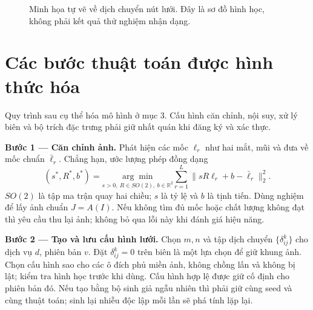 \documentclass[11pt,a4paper]{article}
\newcommand{\R}{\mathbb{R}}
\begin{document}
\begin{figure}[!ht]
\centering
{}
\caption{Minh họa tự vẽ về dịch chuyển nút lưới. Đây là sơ đồ hình học, không phải kết quả thử nghiệm nhận dạng.}
\end{figure}

\newpage
\section{Các bước thuật toán được hình thức hóa}
Quy trình sau cụ thể hóa mô hình ở mục 3. Cấu hình căn chỉnh, nội suy, xử lý biên và bộ trích đặc trưng phải giữ nhất quán khi đăng ký và xác thực.

\textbf{Bước 1 --- Căn chỉnh ảnh.} Phát hiện các mốc $\ell_r$ như hai mắt, mũi và đưa về mốc chuẩn $\bar\ell_r$. Chẳng hạn, ước lượng phép đồng dạng
\begin{equation}\label{eq:align}
 (s^*,R^*,b^*)=\underset{s>0,\ R\in SO(2),\ b\in\R^2}{\arg\min}
 \sum_{r=1}^{L}\|sR\ell_r+b-\bar\ell_r\|_2^2.
\end{equation}
$SO(2)$ là tập ma trận quay hai chiều; $s$ là tỷ lệ và $b$ là tịnh tiến. Dùng nghiệm để lấy ảnh chuẩn $J=A(I)$. Nếu không tìm đủ mốc hoặc chất lượng không đạt thì yêu cầu thu lại ảnh; không bỏ qua lỗi này khi đánh giá hiệu năng.

\textbf{Bước 2 --- Tạo và lưu cấu hình lưới.} Chọn $m,n$ và tập dịch chuyển $\{\delta_{ij}^k\}$ cho dịch vụ $d$, phiên bản $v$. Đặt $\delta_{ij}^k=0$ trên biên là một lựa chọn để giữ khung ảnh. Chọn cấu hình sao cho các ô đích phủ miền ảnh, không chồng lấn và không bị lật; kiểm tra hình học trước khi dùng. Cấu hình hợp lệ được giữ cố định cho phiên bản đó. Nếu tạo bằng bộ sinh giả ngẫu nhiên thì phải giữ cùng seed và cùng thuật toán; sinh lại nhiễu độc lập mỗi lần sẽ phá tính lặp lại.
\end{document}

